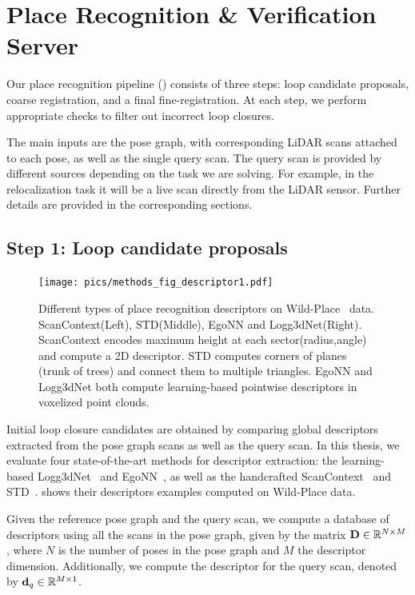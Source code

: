 \section{Place Recognition \& Verification Server} \label{sec:pipeline}
Our place recognition pipeline () consists of three steps: loop candidate proposals, coarse registration, and a final fine-registration. At each step, we perform appropriate checks to filter out incorrect loop closures.

The main inputs are the pose graph, with corresponding LiDAR scans attached to each pose, as well as the single query scan. The query scan is provided by different sources depending on the task we are solving. For example, in the relocalization task it will be a live scan directly from the LiDAR sensor. Further details are provided in the corresponding sections.

\subsection*{\textbf{Step 1: Loop candidate proposals}}
\label{subsubsec:loop-candidate}
\begin{figure}[htbp]
  \centering
  \texttt{[image: pics/methods\_fig\_descriptor1.pdf]}
  \caption{Different types of place recognition descriptors on Wild-Place~\cite{knights2023icra} data. ScanContext(Left), STD(Middle), EgoNN and Logg3dNet(Right). ScanContext encodes maximum height at each sector(radius,angle) and compute a 2D descriptor. STD computes corners of planes (trunk of trees) and connect them to multiple triangles. EgoNN and Logg3dNet both compute learning-based pointwise descriptors in voxelized point clouds.  }
  \label{fig:descriptors_example}
\end{figure}
Initial loop closure candidates are obtained by comparing global descriptors extracted from the pose graph scans as well as the query scan. In this thesis, we evaluate four state-of-the-art methods for descriptor extraction: the learning-based Logg3dNet~\cite{vidanapathirana2022icra} and EgoNN~\cite{komorowski2022ral}, as well as the handcrafted ScanContext~\cite{kim2018iros} and STD~\cite{yuan2023icra}.  shows their descriptors examples computed on Wild-Place data.  

Given the reference pose graph and the query scan, we compute a database of descriptors using all the scans in the pose graph, given by the matrix $\mathbf{D} \in \mathbb{R}^{N\times M}$, where $N$ is the number of poses in the pose graph and $M$ the descriptor dimension. Additionally, we compute the descriptor for the query scan, denoted by $\mathbf{d}_{q} \in \mathbb{R}^{M \times 1}$. 

